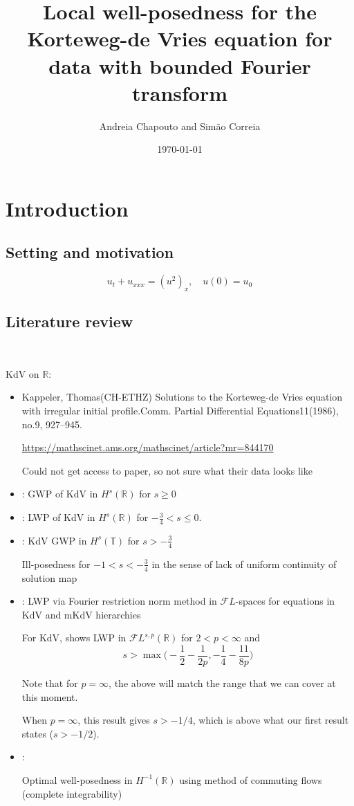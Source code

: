 \documentclass[a4paper, 11pt]{amsart}
\date{\today}
\author{Andreia Chapouto and Sim\~ao Correia}
\title{Local well-posedness for the Korteweg-de Vries equation for data with bounded Fourier transform}
\newcommand{\T}{\mathbb{T}}
\newcommand{\R}{\mathbb{R}}
\theoremstyle{plain}
\theoremstyle{definition}
\theoremstyle{remark}
\newcommand{\5}{\text{V}}
\newcommand{\FL}{\mathcal{F} L}
\numberwithin{equation}{section}
\theoremstyle{mytheoremstyle} \newtheorem{nota}[thm]{Remark}
\theoremstyle{mytheoremstyle} \newtheorem{exemplo}[thm]{Example}
\newcommand{\blue}{\color{blue}}
\begin{document}
\maketitle
\section{Introduction}
\subsection{Setting and motivation}
\begin{equation}\tag{KdV}\label{KdV}
	u_t + u_{xxx} = (u^2)_x,\quad u(0)=u_0
\end{equation}


\subsection{Literature review}\

KdV on $\R$:

\begin{itemize}


\item Kappeler, Thomas(CH-ETHZ)
Solutions to the Korteweg-de Vries equation with irregular initial profile.Comm. Partial Differential Equations11(1986), no.9, 927–945.

\url{https://mathscinet.ams.org/mathscinet/article?mr=844170}

Could not get access to paper, so not sure what their data looks like


\item \cite{B93}: GWP of KdV in $H^s(\R)$ for $s\ge 0$


\item \cite{KPV96}: LWP of KdV in $H^s(\R)$ for $-\frac34<s\le 0$.


\item \cite{CCT03}: KdV GWP in $H^{s}(\T)$ for $s>-\frac34$

Ill-posedness for $-1<s<-\frac34$ in the sense of lack of uniform continuity of solution map


\item \cite{G10}: LWP via Fourier restriction norm method in $\FL$-spaces for equations in KdV and mKdV hierarchies

For KdV, shows LWP in $\FL^{s,p}(\R)$ for $2<p<\infty$ and
$$s>\max\Big( -\frac12 - \frac{1}{2p}, -\frac14 - \frac{11}{8p} \Big)$$


Note that for $p=\infty$, the above will match the range that we can cover at this moment.

{\blue When $p=\infty$, this result gives $s>-1/4$, which is above what our first result states ($s>-1/2$).}

\item \cite{KV19}:

Optimal well-posedness in $H^{-1}(\R)$ using method of commuting flows (complete integrability)
\end{itemize}
\end{document}
